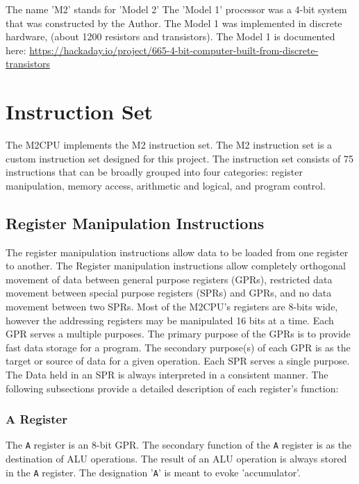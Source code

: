 \documentclass[a4paper,12pt]{article}
\newcommand{\mt}{M2CPU}
\newcommand{\mi}{M2 instruction set}
\newcommand{\inum}{75}
\newcommand{\Ar}{\texttt{A}}
\begin{document}
The name 'M2' stands for 'Model 2' The 'Model 1' processor was a 4-bit system 
that was constructed by the Author. The Model 1 was implemented in discrete 
hardware, (about 1200 resistors and transistors). The Model 1 is documented 
here: 
\url{https://hackaday.io/project/665-4-bit-computer-built-from-discrete-transistors}
\par

\newpage
\section{Instruction Set}
The \mt{} implements the \mi{}. The \mi{} is a custom instruction set designed for
this project. The instruction set consists of \inum{} instructions that can be 
broadly grouped into four categories: register manipulation, memory access,
arithmetic and logical, and program control.
\par

\subsection{Register Manipulation Instructions}
The register manipulation instructions allow data to be loaded from one
register to another. The Register manipulation instructions allow completely
orthogonal movement of data between general purpose registers (GPRs), 
restricted data movement between special purpose registers (SPRs) and GPRs, 
and no data movement between two SPRs. Most of the \mt{}'s registers are 8-bits
wide, however the addressing registers may be manipulated 16 bits at a time. 
Each GPR serves a multiple purposes. The primary purpose of the GPRs is to 
provide fast data storage for a program. The secondary purpose(s) of each GPR is
as the target or source of data for a given operation. Each SPR serves a single 
purpose. The Data held in an SPR is always interpreted in a consistent manner. 
The following subsections provide a detailed description of each register's 
function:
\par

\subsubsection{A Register}
The \Ar{} register is an 8-bit GPR. The secondary function of the \Ar{} 
register is as the destination of ALU operations. The result of an ALU 
operation is always stored in the \Ar{} register. The designation '\Ar{}' is 
meant to evoke 'accumulator'.
\par
\end{document}
